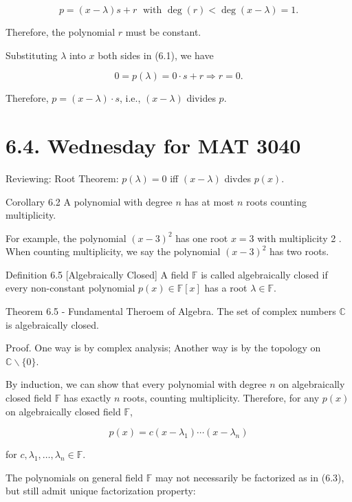 \documentclass[11pt]{article}
\begin{document}
\[
p = \left( {x - \lambda }\right) s + r\;\text{ with }\deg \left( r\right)  < \deg \left( {x - \lambda }\right)  = 1. \tag{6.1}
\]

Therefore, the polynomial \(r\) must be constant.

Substituting \(\lambda\) into \(x\) both sides in (6.1), we have

\[
0 = p\left( \lambda \right)  = 0 \cdot  s + r \Rightarrow  r = 0.
\]

Therefore, \(p = \left( {x - \lambda }\right)  \cdot  s\), i.e., \(\left( {x - \lambda }\right)\) divides \(p\).

\section*{6.4. Wednesday for MAT 3040}

Reviewing: Root Theorem: \(p\left( \lambda \right)  = 0\) iff \(\left( {x - \lambda }\right)\) divdes \(p\left( x\right)\).

Corollary 6.2 A polynomial with degree \(n\) has at most \(n\) roots counting multiplicity.

For example, the polynomial \({\left( x - 3\right) }^2\) has one root \(x = 3\) with multiplicity 2 . When counting multiplicity, we say the polynomial \({\left( x - 3\right) }^2\) has two roots.

Definition 6.5 [Algebraically Closed] A field \(\mathbb{F}\) is called algebraically closed if every non-constant polynomial \(p\left( x\right)  \in  \mathbb{F}\left\lbrack  x\right\rbrack\) has a root \(\lambda  \in  \mathbb{F}\).

Theorem 6.5 - Fundamental Theroem of Algebra. The set of complex numbers \(\mathbb{C}\) is algebraically closed.

Proof. One way is by complex analysis; Another way is by the topology on \(\mathbb{C} \smallsetminus  \{ 0\}\).

By induction, we can show that every polynomial with degree \(n\) on algebraically closed field \(\mathbb{F}\) has exactly \(n\) roots, counting multiplicity. Therefore, for any \(p\left( x\right)\) on algebraically closed field \(\mathbb{F}\),

\[
p\left( x\right)  = c\left( {x - {\lambda }_1}\right) \cdots \left( {x - {\lambda }_n}\right)  \tag{6.3}
\]

for \(c,{\lambda }_1,\ldots ,{\lambda }_n \in  \mathbb{F}\).

The polynomials on general field \(\mathbb{F}\) may not necessarily be factorized as in (6.3), but still admit unique factorization property:
\end{document}
